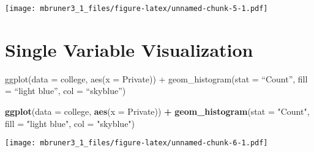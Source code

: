 \documentclass[
]{article}
\newenvironment{Shaded}{\begin{snugshade}}{\end{snugshade}}
\newcommand{\DataTypeTok}[1]{\textcolor[rgb]{0.13,0.29,0.53}{#1}}
\newcommand{\KeywordTok}[1]{\textcolor[rgb]{0.13,0.29,0.53}{\textbf{#1}}}
\newcommand{\NormalTok}[1]{#1}
\newcommand{\OperatorTok}[1]{\textcolor[rgb]{0.81,0.36,0.00}{\textbf{#1}}}
\newcommand{\StringTok}[1]{\textcolor[rgb]{0.31,0.60,0.02}{#1}}
\begin{document}
\texttt{[image: mbruner3\_1\_files/figure-latex/unnamed-chunk-5-1.pdf]}

\hypertarget{single-variable-visualization}{%
\section{Single Variable
Visualization}\label{single-variable-visualization}}

ggplot(data = college, aes(x = Private)) + geom\_histogram(stat =
``Count'', fill = ``light blue'', col = ``skyblue'')

\begin{Shaded}
\begin{Highlighting}[]
\KeywordTok{ggplot}\NormalTok{(}\DataTypeTok{data =}\NormalTok{ college, }\KeywordTok{aes}\NormalTok{(}\DataTypeTok{x =}\NormalTok{ Private)) }\OperatorTok{+}\StringTok{ }\KeywordTok{geom_histogram}\NormalTok{(}\DataTypeTok{stat =} \StringTok{"Count"}\NormalTok{, }\DataTypeTok{fill =} \StringTok{"light blue"}\NormalTok{, }\DataTypeTok{col =} \StringTok{"skyblue"}\NormalTok{)}
\end{Highlighting}
\end{Shaded}

\texttt{[image: mbruner3\_1\_files/figure-latex/unnamed-chunk-6-1.pdf]}
\end{document}
